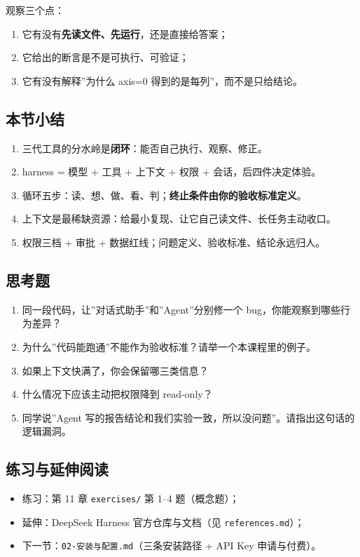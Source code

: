 \documentclass[
]{article}
\providecommand{\tightlist}{%
  \setlength{\itemsep}{0pt}\setlength{\parskip}{0pt}}
\begin{document}
观察三个点：

\begin{enumerate}
\def\labelenumi{\arabic{enumi}.}
\tightlist
\item
  它有没有\textbf{先读文件、先运行}，还是直接给答案；
\item
  它给出的断言是不是可执行、可验证；
\item
  它有没有解释''为什么 axis=0 得到的是每列''，而不是只给结论。
\end{enumerate}

\subsection{本节小结}\label{ux672cux8282ux5c0fux7ed3}

\begin{enumerate}
\def\labelenumi{\arabic{enumi}.}
\tightlist
\item
  三代工具的分水岭是\textbf{闭环}：能否自己执行、观察、修正。
\item
  harness = 模型 + 工具 + 上下文 + 权限 + 会话，后四件决定体验。
\item
  循环五步：读、想、做、看、判；\textbf{终止条件由你的验收标准定义}。
\item
  上下文是最稀缺资源：给最小复现、让它自己读文件、长任务主动收口。
\item
  权限三档 + 审批 + 数据红线；问题定义、验收标准、结论永远归人。
\end{enumerate}

\subsection{思考题}\label{ux601dux8003ux9898}

\begin{enumerate}
\def\labelenumi{\arabic{enumi}.}
\tightlist
\item
  同一段代码，让''对话式助手''和''Agent''分别修一个
  bug，你能观察到哪些行为差异？
\item
  为什么''代码能跑通''不能作为验收标准？请举一个本课程里的例子。
\item
  如果上下文快满了，你会保留哪三类信息？
\item
  什么情况下应该主动把权限降到 read-only？
\item
  同学说''Agent
  写的报告结论和我们实验一致，所以没问题''。请指出这句话的逻辑漏洞。
\end{enumerate}

\subsection{练习与延伸阅读}\label{ux7ec3ux4e60ux4e0eux5ef6ux4f38ux9605ux8bfb}

\begin{itemize}
\tightlist
\item
  练习：第 11 章 \texttt{exercises/} 第 1--4 题（概念题）；
\item
  延伸：DeepSeek Harness 官方仓库与文档（见 \texttt{references.md}）；
\item
  下一节：\texttt{02-安装与配置.md}（三条安装路径 + API Key
  申请与付费）。
\end{itemize}
\end{document}
